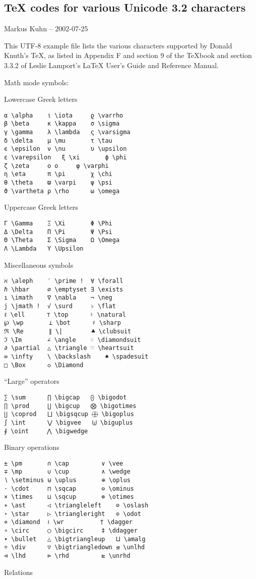 \documentclass{article}
\begin{document}
 
\hypertarget{tex_codes_for_various_unicode_32_characters}{}\subsection*{{TeX codes for various Unicode 3.2 characters}}\label{tex_codes_for_various_unicode_32_characters}

Markus Kuhn -- 2002-07-25

This UTF-8 example file lists the various characters supported by Donald Knuth's TeX, as listed in Appendix F and section 9 of the TeXbook and section 3.3.2 of Leslie Lamport's \LaTeX\xspace  User's Guide and Reference Manual.

Math mode symbols:

Lowercase Greek letters

\begin{verbatim}α \alpha	ι \iota		ϱ \varrho
β \beta		κ \kappa	σ \sigma
γ \gamma	λ \lambda	ς \varsigma
δ \delta	μ \mu		τ \tau
ϵ \epsilon	ν \nu		υ \upsilon
ε \varepsilon	ξ \xi		ϕ \phi
ζ \zeta		ο o		φ \varphi
η \eta		π \pi 		χ \chi
θ \theta	ϖ \varpi	ψ \psi
ϑ \vartheta	ρ \rho		ω \omega
\end{verbatim}
Uppercase Greek letters

\begin{verbatim}Γ \Gamma	Ξ \Xi		Φ \Phi
Δ \Delta	Π \Pi		Ψ \Psi
Θ \Theta	Σ \Sigma	Ω \Omega
Λ \Lambda	Υ \Upsilon
\end{verbatim}
Miscellaneous symbols

\begin{verbatim}ℵ \aleph	′ \prime !	∀ \forall
ℏ \hbar		∅ \emptyset	∃ \exists
ı \imath	∇ \nabla	¬ \neg
j \jmath !	√ \surd		♭ \flat
ℓ \ell		⊤ \top		♮ \natural
℘ \wp		⊥ \bot		♯ \sharp
ℜ \Re		∥ \|		♣ \clubsuit
ℑ \Im		∠ \angle	♢ \diamondsuit
∂ \partial	△ \triangle	♡ \heartsuit
∞ \infty	\ \backslash	♠ \spadesuit
□ \Box		◇ \Diamond
\end{verbatim}
“Large” operators

\begin{verbatim}∑ \sum		⋂ \bigcap	⨀ \bigodot
∏ \prod		⋃ \bigcup	⨂ \bigotimes
∐ \coprod	⨆ \bigsqcup	⨁ \bigoplus
∫ \int		⋁ \bigvee	⨄ \biguplus
∮ \oint		⋀ \bigwedge
\end{verbatim}
Binary operations

\begin{verbatim}± \pm		∩ \cap		   ∨ \vee
∓ \mp		∪ \cup		   ∧ \wedge
∖ \setminus	⊎ \uplus	   ⊕ \oplus
⋅ \cdot		⊓ \sqcap	   ⊖ \ominus
× \times	⊔ \sqcup	   ⊗ \otimes
∗ \ast		◁ \triangleleft	   ⊘ \oslash
⋆ \star		▷ \triangleright   ⊙ \odot
⋄ \diamond	≀ \wr		   † \dagger
∘ \circ		◯ \bigcirc	   ‡ \ddagger
∙ \bullet	△ \bigtriangleup   ⨿ \amalg
÷ \div		▽ \bigtriangledown ⊴ \unlhd
⊲ \lhd		⊳ \rhd		   ⊵ \unrhd
\end{verbatim}
Relations
\end{document}
